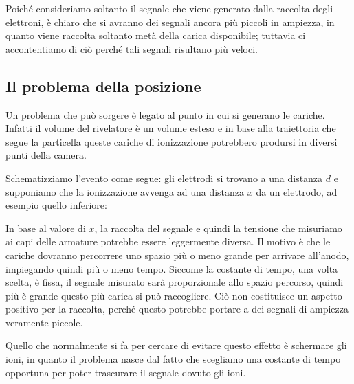 Poiché consideriamo soltanto il segnale che viene generato dalla raccolta degli elettroni, è chiaro che si avranno dei segnali ancora più piccoli in ampiezza, in quanto viene raccolta soltanto metà della carica disponibile; tuttavia ci accontentiamo di ciò perché tali segnali risultano più veloci.

\subsection{Il problema della posizione}
Un problema che può sorgere è legato al punto in cui si generano le cariche. Infatti il volume del rivelatore è un volume esteso e in base alla traiettoria che segue la particella queste cariche di ionizzazione potrebbero prodursi in diversi punti della camera.

Schematizziamo l'evento come segue: gli elettrodi si trovano a una distanza $d$ e supponiamo che la ionizzazione avvenga ad una distanza $x$ da un elettrodo, ad esempio quello inferiore:

\begin{figure}[H]
   \centering
\end{figure}

In base al valore di $x$, la raccolta del segnale e quindi la tensione che misuriamo ai capi delle armature potrebbe essere leggermente diversa. Il motivo è che le cariche dovranno percorrere uno spazio più o meno grande per arrivare all'anodo, impiegando quindi più o meno tempo. Siccome la costante di tempo, una volta scelta, è fissa, il segnale misurato sarà proporzionale allo spazio percorso, quindi più è grande questo più carica si può raccogliere. Ciò non costituisce un aspetto positivo per la raccolta, perché questo potrebbe portare a dei segnali di ampiezza veramente piccole.

Quello che normalmente si fa per cercare di evitare questo effetto è schermare gli ioni, in quanto il problema nasce dal fatto che scegliamo una costante di tempo opportuna per poter trascurare il segnale dovuto gli ioni.

